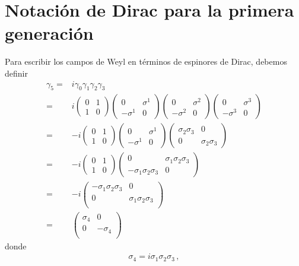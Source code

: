 \section{Notación de Dirac para la primera generación}


Para escribir los campos de Weyl en términos de espinores de Dirac, debemos definir
\begin{align}
  \gamma_5=&i\gamma_0\gamma_1\gamma_2\gamma_3 \nonumber\\
=&i
\begin{pmatrix}
0 & 1\\
1 & 0  
\end{pmatrix}
\begin{pmatrix}
0 & \sigma^1\\
-\sigma^1 & 0  
\end{pmatrix}
\begin{pmatrix}
0 & \sigma^2\\
-\sigma^2 & 0  
\end{pmatrix}
\begin{pmatrix}
0 & \sigma^3\\
-\sigma^3 & 0  
\end{pmatrix}\nonumber\\
=&-i\begin{pmatrix}
0 & 1\\
1 & 0  
\end{pmatrix}
\begin{pmatrix}
0 & \sigma^1\\
-\sigma^1 & 0  
\end{pmatrix}
\begin{pmatrix}
\sigma_2\sigma_3 & 0\\
0 & \sigma_2\sigma_3
\end{pmatrix}\nonumber\\
=&-i\begin{pmatrix}
0 & 1\\
1 & 0  
\end{pmatrix}
\begin{pmatrix}
0 & \sigma_1\sigma_2\sigma_3 \\
-\sigma_1\sigma_2\sigma_3 & 0
\end{pmatrix}\nonumber\\
=&-i\begin{pmatrix}
-\sigma_1\sigma_2\sigma_3 & 0 \\
0 &\sigma_1\sigma_2\sigma_3\\
\end{pmatrix}\nonumber\\
=&\begin{pmatrix}
\sigma_4 & 0 \\
0 &-\sigma_4\\
\end{pmatrix}
\end{align}
donde
\begin{align}
  \sigma_4=i\sigma_1\sigma_2\sigma_3\,,
\end{align}

